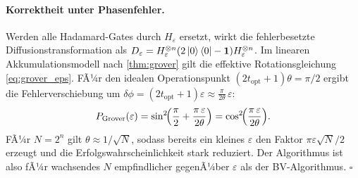 ﻿\documentclass[11pt,a4paper]{article}
\theoremstyle{definition}
\newcommand{\eps}{\varepsilon}
\begin{document}
\paragraph{Korrektheit unter Phasenfehler.}
Werden alle Hadamard-Gates durch $H_\varepsilon$ ersetzt, wirkt die
fehlerbesetzte Diffusionstransformation als
$D_\varepsilon = H_\varepsilon^{\otimes n}(2\ket{0}\bra{0}-\mathbf{1})H_\varepsilon^{\otimes n}$.
Im linearen Akkumulationsmodell nach \cref{thm:grover} gilt die effektive
Rotationsgleichung \eqref{eq:grover_eps}.  FÃ¼r den idealen Operationspunkt
$(2t_{\mathrm{opt}}+1)\theta = \pi/2$ ergibt die Fehlerverschiebung
um $\delta\phi = (2t_{\mathrm{opt}}+1)\eps \approx \frac{\pi}{2\theta}\,\eps$:
\[
  P_{\mathrm{Grover}}(\eps)
  = \sin^2\!\Bigl(\frac{\pi}{2} + \frac{\pi\,\eps}{2\theta}\Bigr)
  = \cos^2\!\Bigl(\frac{\pi\,\eps}{2\theta}\Bigr).
\]
FÃ¼r $N=2^n$ gilt $\theta\approx 1/\sqrt{N}$, sodass bereits ein kleines
$\eps$ den Faktor $\pi\eps\sqrt{N}/2$ erzeugt und die Erfolgswahrscheinlichkeit
stark reduziert.  Der Algorithmus ist also fÃ¼r wachsendes $N$ empfindlicher
gegenÃ¼ber $\eps$ als der BV-Algorithmus.  $\square$
\end{document}
